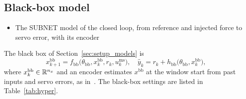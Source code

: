\subsection{Black-box model}\label{app:setup_bb}
\ifdraft
\begin{itemize}
\item The SUBNET model of the closed loop, from reference and injected force to servo error, with its encoder
\end{itemize}
\fi
The black box of Section~\ref{sec:setup_models} is
\begin{equation}
 x^{\mathrm{bb}}_{k+1}=f_{\mathrm{bb}}\bigl(\theta_{\mathrm{bb}},x^{\mathrm{bb}}_k,r_k,u^{\mathrm{ms}}_k\bigr),\quad
 \hat y_k=r_k+h_{\mathrm{bb}}\bigl(\theta_{\mathrm{bb}},x^{\mathrm{bb}}_k\bigr),
 \label{eq:setup_bb}
\end{equation}
where $x^{\mathrm{bb}}_k\in\mathbb{R}^{n_x}$ and an encoder estimates
$x^{\mathrm{bb}}$ at the window start from past inputs and servo errors, as
in~\cite{beintema2023subnet}.
The black-box settings are listed in Table~\ref{tab:hyper}.
\begin{table}[t]
  \centering
  \caption{Black-box configurations and their best validation $\mathrm{NRMS}_e$, using at most 80\,000 updates.}
  \label{tab:app_bb_search}
  
\end{table}

